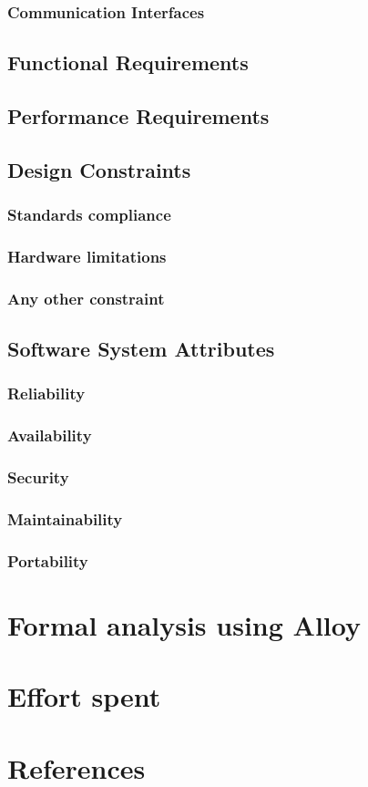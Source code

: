 \documentclass{article}
\begin{document}
	\subsubsection{Communication Interfaces}
	\subsection{Functional Requirements}
	\subsection{Performance Requirements}
	\subsection{Design Constraints}
	\subsubsection{Standards compliance}
	\subsubsection{Hardware limitations}
	\subsubsection{Any other constraint}
	\subsection{Software System Attributes}
	\subsubsection{Reliability}
	\subsubsection{Availability}
	\subsubsection{Security}
	\subsubsection{Maintainability}
	\subsubsection{Portability}
	
	\section{Formal analysis using Alloy}
	
	\section{Effort spent}
	
	\section{References}
	
	
\end{document}
